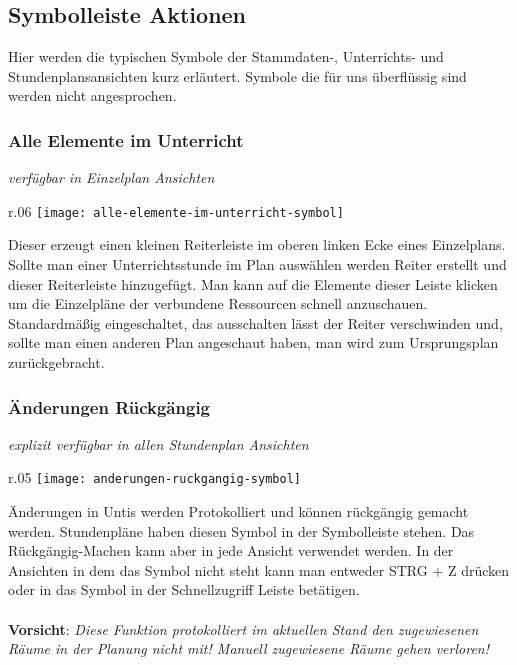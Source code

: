\subsection{Symbolleiste Aktionen}

Hier werden die typischen Symbole der Stammdaten-, Unterrichts- und Stundenplansansichten kurz erläutert. Symbole die für uns überflüssig sind werden nicht angesprochen.\\

\subsubsection{Alle Elemente im Unterricht}
{\small\textit{verfügbar in Einzelplan Ansichten\\}\par}

\begin{wrapfigure}{r}{.06\textwidth}
	\vspace{-50pt}
	\texttt{[image: alle-elemente-im-unterricht-symbol]}
	\vspace{-35pt}
\end{wrapfigure}

\noindent
Dieser erzeugt einen kleinen Reiterleiste im oberen linken Ecke eines Einzelplans. Sollte man einer Unterrichtsstunde im Plan auswählen werden Reiter erstellt und dieser Reiterleiste hinzugefügt. Man kann auf die Elemente dieser Leiste klicken um die Einzelpläne der verbundene Ressourcen schnell anzuschauen. Standardmäßig eingeschaltet, das ausschalten lässt der Reiter verschwinden und, sollte man einen anderen Plan angeschaut haben, man wird zum Ursprungsplan zurückgebracht.\\

\subsubsection{Änderungen Rückgängig}
{\small\textit{explizit verfügbar in allen Stundenplan Ansichten\\}\par}

\begin{wrapfigure}{r}{.05\textwidth}
	\vspace{-50pt}
	\texttt{[image: anderungen-ruckgangig-symbol]}
	\vspace{-35pt}
\end{wrapfigure}

\noindent
Änderungen in Untis werden Protokolliert und können rückgängig gemacht werden. Stundenpläne haben diesen Symbol in der Symbolleiste stehen. Das Rückgängig-Machen kann aber in jede Ansicht verwendet werden. In der Ansichten in dem das Symbol nicht steht kann man entweder STRG + Z drücken oder in das Symbol in der Schnellzugriff Leiste betätigen.\\
\\
\textbf{Vorsicht}: \textit{Diese Funktion protokolliert im aktuellen Stand den zugewiesenen Räume in der Planung nicht mit! Manuell zugewiesene Räume gehen verloren!}


